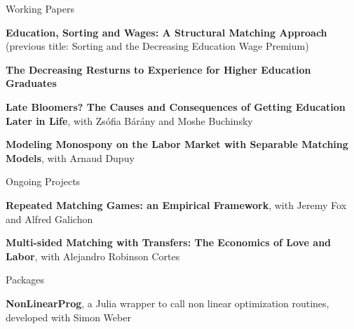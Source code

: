 \documentclass{resume} %
\begin{document}
\begin{rSection}{Working Papers}

  {\bf Education, Sorting and Wages: A Structural Matching Approach} (previous title: Sorting and the Decreasing Education Wage Premium)
  
  {\bf The Decreasing Resturns to Experience for Higher Education Graduates}

  {\bf Late Bloomers? The Causes and Consequences of Getting Education Later in Life}, with Zsófia Bárány and Moshe Buchinsky

  {\bf Modeling Monospony on the Labor Market with Separable Matching Models}, with Arnaud Dupuy
  
  \end{rSection}

\begin{rSection}{Ongoing Projects}

{\bf Repeated Matching Games: an Empirical Framework}, with Jeremy Fox and Alfred Galichon

{\bf Multi-sided Matching with Transfers: The Economics of Love and Labor}, with Alejandro Robinson Cortes
\end{rSection}

\begin{rSection}{Packages}

{\bf NonLinearProg}, a Julia wrapper to call non linear optimization routines, developed with Simon Weber
\end{rSection}

\end{document}
